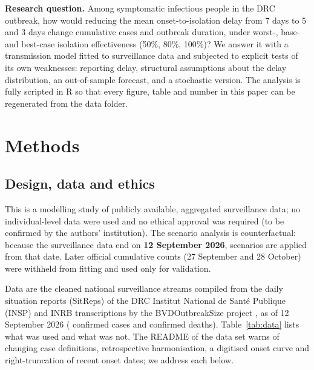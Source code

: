 \documentclass[11pt,a4paper]{article}
\begin{document}
\textbf{Research question.} Among symptomatic infectious people in the DRC outbreak, how would reducing the mean onset-to-isolation delay from 7 days to 5 and 3 days change cumulative cases and outbreak duration, under worst-, base- and best-case isolation effectiveness (50\%, 80\%, 100\%)? We answer it with a transmission model fitted to surveillance data and subjected to explicit tests of its own weaknesses: reporting delay, structural assumptions about the delay distribution, an out-of-sample forecast, and a stochastic version. The analysis is fully scripted in R so that every figure, table and number in this paper can be regenerated from the data folder.

\section{Methods}
\subsection{Design, data and ethics}
This is a modelling study of publicly available, aggregated surveillance data; no individual-level data were used and no ethical approval was required (to be confirmed by the authors' institution). The scenario analysis is counterfactual: because the surveillance data end on \textbf{12 September 2026}, scenarios are applied from that date. Later official cumulative counts (27 September and 28 October) were withheld from fitting and used only for validation.

Data are the cleaned national surveillance streams compiled from the daily situation reports (SitReps) of the DRC Institut National de Sant\'e Publique (INSP) and INRB transcriptions by the BVDOutbreakSize project \citep{bvdoutbreaksize2026}, as of 12 September 2026 (\nConfirmed{} confirmed cases and \nDeaths{} confirmed deaths). Table~\ref{tab:data} lists what was used and what was not. The README of the data set warns of changing case definitions, retrospective harmonisation, a digitised onset curve and right-truncation of recent onset dates; we address each below.
\end{document}
